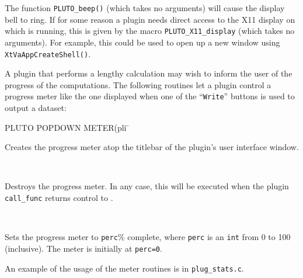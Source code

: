The function {\tt PLUTO\_beep()} (which takes no arguments)
will cause the display bell to ring.  If for some reason a plugin
needs direct access to the X11 display on which \afnit is running,
this is given by the macro {\tt PLUTO\_X11\_display} (which
takes no arguments).  For example, this could be used to open up a
new window using {\tt XtVaAppCreateShell()}.

A plugin that performs a lengthy calculation may wish to inform
the user of the progress of the computations.  The following routines let a plugin
control a progress meter like the one displayed when one of the
\afni ``{\tt Write}'' buttons is used to output a dataset:
\begin{tabbing}
  \blob PLUTO POPDOWN METER(pli \= \kill
%
   \> \parbox[t]{3.7in}{
                                              Creates the progress meter atop
                                              the titlebar of the plugin's
                                              user interface window.} \\[.9ex]
%
   \> \parbox[t]{3.7in}{
                                               Destroys the progress meter.
                                               In any case, this will be executed
                                               when the plugin {\tt call\_func}
                                               returns control to \afni.} \\[.9ex]
%
   \> \parbox[t]{3.7in}{
                                                Sets the progress meter to
                                                {\tt perc}\% complete, where
                                                {\tt perc} is an {\tt int}
                                                from 0 to 100 (inclusive).
                                                The meter is initially at {\tt perc=0}.}
\end{tabbing}
An example of the usage of the meter routines is in {\tt plug\_stats.c}.

